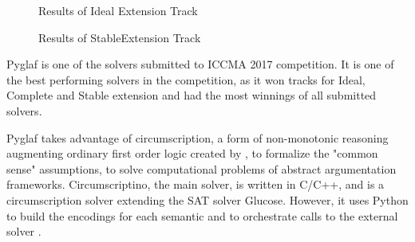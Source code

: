 \begin{figure}
	\centering
	
	\caption{Results of Ideal Extension Track}
	\label{fig:idTrack}
	
\end{figure}

\begin{figure}
	\centering
	
	\caption{Results of StableExtension Track}
	\label{fig:stTrack}
\end{figure}
Pyglaf is one of the solvers submitted to ICCMA 2017 competition. It is one of the best performing solvers in the competition, as it won tracks for Ideal, Complete and Stable extension and had the most winnings of all submitted solvers.

Pyglaf takes advantage of circumscription, a form of non-monotonic reasoning augmenting ordinary first order logic created by \citet{circumpscription}, to formalize the "common sense" assumptions, to solve computational problems of abstract argumentation frameworks.  Circumscriptino, the main solver, is written in C/C++, and is a circumscription solver extending the SAT solver Glucose. However, it uses Python to build the encodings for each semantic and to orchestrate calls to the external solver \citep{pyglaf}. 


